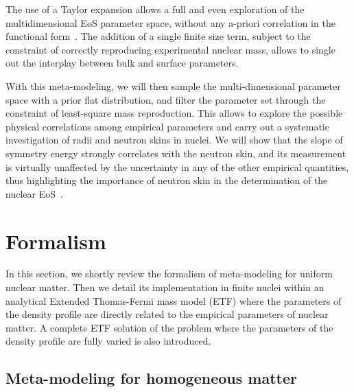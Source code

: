 \documentclass
[aps,prc,twocolumn,showpacs,showkeys,amsmath,floatfix,superscriptaddress]{revtex4}
\begin{document}
The use of a Taylor expansion allows a full and even exploration of the multidimensional EoS parameter  space, without any a-priori correlation in the functional form~\cite{Casali2}. The addition of a single finite size term, subject to the constraint of correctly reproducing experimental nuclear mass, allows to single out the interplay between bulk and surface parameters. 

With this meta-modeling, we will then sample the multi-dimensional parameter space with a prior flat distribution, and filter the parameter set through the constraint of least-square mass reproduction. This allows to explore the possible physical correlations among empirical parameters and carry out a systematic investigation of radii and neutron skins
in nuclei. We will show that the slope of symmetry energy strongly correlates with the neutron skin, and its measurement is virtually unaffected by the uncertainty in any of the other empirical quantities, thus highlighting the importance of neutron skin in the determination of the nuclear EoS~\cite{Brown,Typel,Piekarewicz}.
 

\section{Formalism} \label{sec:hom}

{In this section, we shortly review the formalism of meta-modeling for uniform nuclear matter. Then we detail its implementation in finite nuclei within an analytical Extended Thomas-Fermi mass model (ETF) where the parameters of the density profile are directly related to the empirical parameters of nuclear matter. 
A complete ETF solution of the problem where the parameters  of the density profile are fully varied is also introduced.}


\subsection{Meta-modeling for homogeneous matter}\label{sec:emp_eos}
\end{document}
